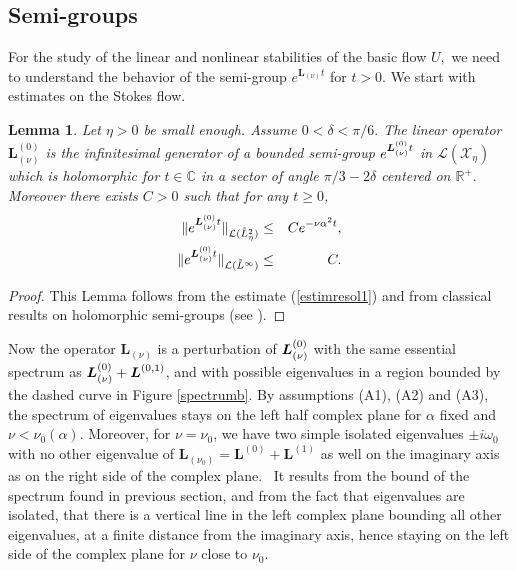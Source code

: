 \documentclass[11pt]{article}
\newtheorem{lemma}[theorem]{Lemma}
\begin{document}


\subsection{Semi-groups}




For the study of the linear and nonlinear stabilities of the basic flow $U,$
we need to understand the behavior of the semi-group $e^{\boldsymbol{L}%
_{(\nu )}t}$ for $t>0.$
We start with estimates on the Stokes flow.

\begin{lemma} Let $\eta > 0$ be small enough.
Assume $0<\delta <\pi /6.$ The linear operator $\boldsymbol{L}_{(\nu
)}^{(0)} $ is the infinitesimal generator of a bounded semi-group $e^{%
\boldsymbol{L}_{(\nu )}^{(0)}t}$ in $\mathcal{L}(\mathcal{X}_{\eta})$ which is 
holomorphic for $t\in \mathbb{C}$ in a sector of angle {$\pi /3-2\delta $}
centered on $\mathbb{R}^{+}.$ Moreover there exists $C>0$ such that for any $t \ge 0$,
\begin{eqnarray}
\|e^{\boldsymbol{L}_{(\nu )}^{(0)}t}\|_{\mathcal{L}(\mathring{L}_{\eta}^{2})}
&\leq &Ce^{-\nu \alpha ^{2}t},  \notag \\
\|e^{\boldsymbol{L}_{(\nu )}^{(0)}t}\|_{\mathcal{L}(\mathring{L}^{\infty })}
&\leq &C.  \label{est semigr L(0)}
\end{eqnarray}
\end{lemma}

\begin{proof}
This Lemma follows from the estimate (\ref{estimresol1}) and from classical results
on holomorphic semi-groups (see \cite{Kato}).
\end{proof}

Now the operator $\boldsymbol{L}_{(\nu )}$ is a perturbation of $\boldsymbol{%
L}_{(\nu )}^{(0)}$ with the same essential spectrum as $\boldsymbol{%
L}_{(\nu )}^{(0)}+\boldsymbol{L}^{(0,1)}$, and with possible eigenvalues in
a region bounded by the dashed curve in Figure \ref{spectrumb}. 
By assumptions (A1), (A2) and (A3), the spectrum of eigenvalues stays on the left half complex
plane for $\alpha$ fixed and $\nu < \nu_0(\alpha)$. 
Moreover, for $\nu = \nu_{0}$,  we have
two simple isolated eigenvalues $\pm i\omega _{0}$ with
no other eigenvalue of $\boldsymbol{L}_{(\nu _{0})}=\boldsymbol{L}^{(0)}+%
\boldsymbol{L}^{(1)}$ as well on the imaginary axis as on the right side of
the complex plane. \ It results from the bound of the spectrum found in
previous section, and from the fact that eigenvalues are isolated, that
there is a vertical line in the left complex plane bounding all other
eigenvalues, at a finite distance from the imaginary axis, hence staying on
the left side of the complex plane for $\nu $ close to $\nu _{0}.$ 
\end{document}
